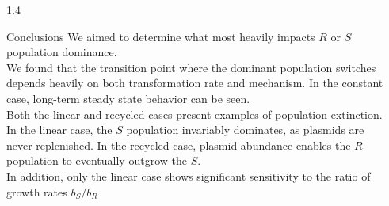\documentclass[final]{beamer}
\newlength{\sepwid}
\newlength{\onecolwid}
\begin{document}
\begin{frame}[t]
\begin{block}
\begin{columns}[t]

\end{columns} %
\end{block}
\begin{block}

\begin{columns}[t] %

\begin{column}{1.4\onecolwid}
  \begin{alertblock}{Conclusions}
    We aimed to determine what most heavily impacts $R$ or $S$ population dominance. \\
    \quad\quad We found that the transition point where the dominant population switches
    depends heavily on both transformation rate and mechanism. In the constant case,
    long-term steady state behavior can be seen.\\
    \quad\quad Both the linear and recycled cases present examples of population
    extinction. In the linear case, the $S$ population invariably dominates,
    as plasmids are never replenished. In the recycled case, plasmid
    abundance enables the $R$ population to eventually outgrow the $S$.\\
    \quad\quad In addition, only the linear case shows significant sensitivity
    to the ratio of growth rates $b_S/b_R$

  \end{alertblock}
\end{column}

\begin{column}{\sepwid}\end{column} %


\end{columns}
\end{block}
\end{frame}
\end{document}
